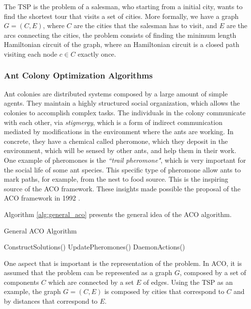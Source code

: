 		The TSP is the problem of a salesman, who starting from a initial city, wants to find the shortest tour that visits a set of cities. More formally, we have a graph $G=(C,E)$, where $C$ are the cities that the salesman has to visit, and $E$ are the arcs connecting the cities, the problem consists of finding the minimum length Hamiltonian circuit of the graph, where an Hamiltonian circuit is a closed path visiting each node $c \in C$ exactly once.
		\subsubsection*{Ant Colony Optimization Algorithms}
		\label{subsubsec:ant_algorithms}

		Ant colonies are distributed systems \cite{acobook} composed by a large amount of simple agents. They maintain a highly structured social organization, which allows the colonies to accomplish complex tasks. The individuals in the colony communicate with each other, via \emph{stigmergy}, which is a form of indirect communication mediated by modifications in the environment where the ants are working. In concrete, they have a chemical called pheromone, which they deposit in the environment, which will be sensed by other ants, and help them in their work. One example of pheromones is the \emph{``trail pheromone"}, which is very important for the social life of some ant species. This specific type of pheromone allow ants to mark paths, for example, from the nest to food source. This is the inspiring source of the ACO framework. 
		These insights made possible the proposal of the ACO framework in 1992 \cite{dorigo92}. 	

		Algorithm \ref{alg:general_aco} presents the general idea of the ACO algorithm.
				\begin{algorithm}
					\caption{General ACO Algorithm}
					\label{alg:general_aco}
					\begin{algorithmic}
						\STATE ConstructSolutions()
						\STATE UpdatePheromones() 
						\STATE DaemonActions() 
					\ENDWHILE
					\end{algorithmic}
				\end{algorithm}
				
				One aspect that is important is the representation of the problem. In ACO, it is assumed that the problem can be represented as a graph $G$, composed by a set of components $C$ which are connected by a set $E$ of edges. Using the TSP as an example, the graph $G=(C,E)$ is composed by cities that correspond to $C$ and by distances that correspond to $E$.
				
